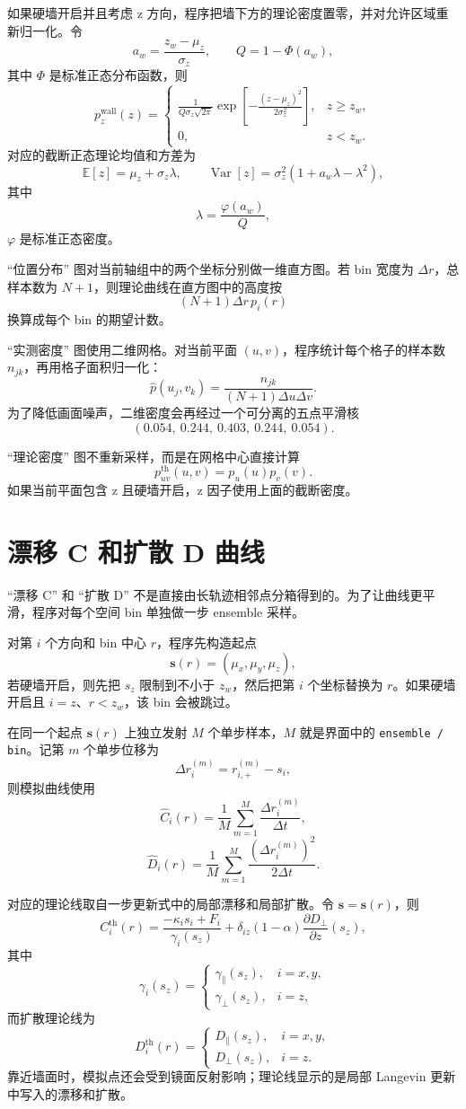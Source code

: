 \documentclass[UTF8,a4paper,12pt,fontset=fandol]{ctexart}
\newcommand{\E}{\mathbb E}
\newcommand{\Var}{\operatorname{Var}}
\begin{document}
如果硬墙开启并且考虑 z 方向，程序把墙下方的理论密度置零，并对允许区域重新归一化。令
\[
  a_w=\frac{z_w-\mu_z}{\sigma_z},\qquad
  Q=1-\Phi(a_w),
\]
其中 $\Phi$ 是标准正态分布函数，则
\[
  p_z^{\mathrm{wall}}(z)=
  \begin{cases}
  \displaystyle
  \frac{1}{Q\sigma_z\sqrt{2\pi}}
  \exp\!\left[-\frac{(z-\mu_z)^2}{2\sigma_z^2}\right],
  & z\ge z_w,\\[1.2em]
  0,& z<z_w.
  \end{cases}
\]
对应的截断正态理论均值和方差为
\[
  \E[z]=\mu_z+\sigma_z\lambda,\qquad
  \Var[z]=\sigma_z^2(1+a_w\lambda-\lambda^2),
\]
其中
\[
  \lambda=\frac{\varphi(a_w)}{Q},
\]
$\varphi$ 是标准正态密度。

``位置分布'' 图对当前轴组中的两个坐标分别做一维直方图。若 bin 宽度为 $\Delta r$，总样本数为 $N+1$，则理论曲线在直方图中的高度按
\[
  (N+1)\Delta r\,p_i(r)
\]
换算成每个 bin 的期望计数。

``实测密度'' 图使用二维网格。对当前平面 $(u,v)$，程序统计每个格子的样本数 $n_{jk}$，再用格子面积归一化：
\[
  \hat p(u_j,v_k)=
  \frac{n_{jk}}{(N+1)\Delta u\Delta v}.
\]
为了降低画面噪声，二维密度会再经过一个可分离的五点平滑核
\[
  (0.054,\ 0.244,\ 0.403,\ 0.244,\ 0.054).
\]

``理论密度'' 图不重新采样，而是在网格中心直接计算
\[
  p_{uv}^{\mathrm{th}}(u,v)=p_u(u)p_v(v).
\]
如果当前平面包含 z 且硬墙开启，z 因子使用上面的截断密度。

\section{漂移 C 和扩散 D 曲线}

``漂移 C'' 和 ``扩散 D'' 不是直接由长轨迹相邻点分箱得到的。为了让曲线更平滑，程序对每个空间 bin 单独做一步 ensemble 采样。

对第 $i$ 个方向和 bin 中心 $r$，程序先构造起点
\[
  \mathbf s(r)=(\mu_x,\mu_y,\mu_z),
\]
若硬墙开启，则先把 $s_z$ 限制到不小于 $z_w$，然后把第 $i$ 个坐标替换为 $r$。如果硬墙开启且 $i=z$、$r<z_w$，该 bin 会被跳过。

在同一个起点 $\mathbf s(r)$ 上独立发射 $M$ 个单步样本，$M$ 就是界面中的 \texttt{ensemble / bin}。记第 $m$ 个单步位移为
\[
  \Delta r_i^{(m)}=r_{i,+}^{(m)}-s_i,
\]
则模拟曲线使用
\[
  \hat C_i(r)=\frac{1}{M}\sum_{m=1}^{M}
  \frac{\Delta r_i^{(m)}}{\Delta t},
\]
\[
  \hat D_i(r)=\frac{1}{M}\sum_{m=1}^{M}
  \frac{\left(\Delta r_i^{(m)}\right)^2}{2\Delta t}.
\]

对应的理论线取自一步更新式中的局部漂移和局部扩散。令 $\mathbf s=\mathbf s(r)$，则
\[
  C_i^{\mathrm{th}}(r)=
  \frac{-\kappa_i s_i+F_i}{\gamma_i(s_z)}
  +\delta_{iz}(1-\alpha)
  \frac{\partial D_{\perp}}{\partial z}(s_z),
\]
其中
\[
  \gamma_i(s_z)=
  \begin{cases}
  \gamma_{\parallel}(s_z),& i=x,y,\\
  \gamma_{\perp}(s_z),& i=z,
  \end{cases}
\]
而扩散理论线为
\[
  D_i^{\mathrm{th}}(r)=
  \begin{cases}
  D_{\parallel}(s_z),& i=x,y,\\
  D_{\perp}(s_z),& i=z.
  \end{cases}
\]
靠近墙面时，模拟点还会受到镜面反射影响；理论线显示的是局部 Langevin 更新中写入的漂移和扩散。
\end{document}
